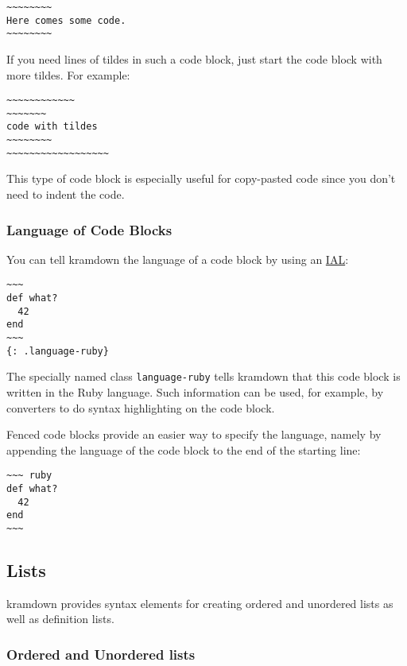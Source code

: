 \documentclass[a4paper]{article}
\begin{document}
\begin{verbatim}
~~~~~~~~
Here comes some code.
~~~~~~~~
\end{verbatim}

If you need lines of tildes in such a code block, just start the code
block with more tildes. For example:

\begin{verbatim}
~~~~~~~~~~~~
~~~~~~~
code with tildes
~~~~~~~~
~~~~~~~~~~~~~~~~~~
\end{verbatim}

This type of code block is especially useful for copy-pasted code since
you don't need to indent the code.

\hypertarget{language-of-code-blocks}{\subsubsection{Language of Code
Blocks}\label{language-of-code-blocks}}

You can tell kramdown the language of a code block by using an
\protect\hyperlink{inline-attribute-lists}{IAL}:

\begin{verbatim}
~~~
def what?
  42
end
~~~
{: .language-ruby}
\end{verbatim}

The specially named class \texttt{language-ruby} tells kramdown that
this code block is written in the Ruby language. Such information can be
used, for example, by converters to do syntax highlighting on the code
block.

Fenced code blocks provide an easier way to specify the language, namely
by appending the language of the code block to the end of the starting
line:

\begin{verbatim}
~~~ ruby
def what?
  42
end
~~~
\end{verbatim}

\hypertarget{lists}{\subsection{Lists}\label{lists}}

kramdown provides syntax elements for creating ordered and unordered
lists as well as definition lists.

\hypertarget{ordered-and-unordered-lists}{\subsubsection{Ordered and
Unordered lists}\label{ordered-and-unordered-lists}}
\end{document}
